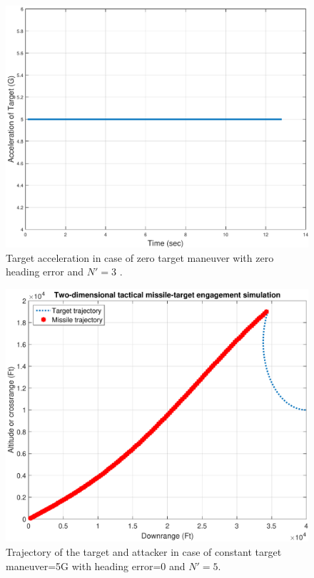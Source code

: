 \begin{figure}[H]
	\centering
	\includegraphics[scale = 0.65]{fig/TargetAccelerationXNT5HE0N3.pdf}
	\caption{Target acceleration in case of zero target maneuver with zero heading error and $N'=3$ .}
	\label{Target accelerationXNT5HE0N3}
\end{figure}



\begin{figure}[htb]
	\centering
	\includegraphics[scale = 0.35]{fig/trajectoryXNT5HE0N5.pdf}
	\caption{Trajectory of the target and attacker in case of constant target maneuver=5G with heading error=0 and $N'=5$.}
	\label{trajectory0NN5}
\end{figure}


